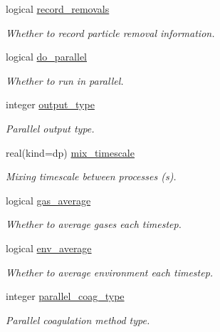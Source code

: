\begin{DoxyCompactItemize}
logical \mbox{\hyperlink{structpmc__run__part_1_1run__part__opt__t_a63a406f5601fa3c56666e77d81f3be7d}{record\+\_\+removals}}
\begin{DoxyCompactList}\small\item\em Whether to record particle removal information. \end{DoxyCompactList}\item 
logical \mbox{\hyperlink{structpmc__run__part_1_1run__part__opt__t_a0a4ada61c12b6bd4fdee11da5708bd2a}{do\+\_\+parallel}}
\begin{DoxyCompactList}\small\item\em Whether to run in parallel. \end{DoxyCompactList}\item 
integer \mbox{\hyperlink{structpmc__run__part_1_1run__part__opt__t_ad8db4996ae11787763d007f042993920}{output\+\_\+type}}
\begin{DoxyCompactList}\small\item\em Parallel output type. \end{DoxyCompactList}\item 
real(kind=dp) \mbox{\hyperlink{structpmc__run__part_1_1run__part__opt__t_aeb96c48bd308f6c3cd27638b7efcada0}{mix\+\_\+timescale}}
\begin{DoxyCompactList}\small\item\em Mixing timescale between processes (s). \end{DoxyCompactList}\item 
logical \mbox{\hyperlink{structpmc__run__part_1_1run__part__opt__t_a5c78557410f6a45d7202508c11d0eaab}{gas\+\_\+average}}
\begin{DoxyCompactList}\small\item\em Whether to average gases each timestep. \end{DoxyCompactList}\item 
logical \mbox{\hyperlink{structpmc__run__part_1_1run__part__opt__t_af75cb8de416e69b61672a5272cb39eaa}{env\+\_\+average}}
\begin{DoxyCompactList}\small\item\em Whether to average environment each timestep. \end{DoxyCompactList}\item 
integer \mbox{\hyperlink{structpmc__run__part_1_1run__part__opt__t_a14e0a9d5c567ae779504e48567f856b9}{parallel\+\_\+coag\+\_\+type}}
\begin{DoxyCompactList}\small\item\em Parallel coagulation method type. \end{DoxyCompactList}\item 

\end{DoxyCompactItemize}

